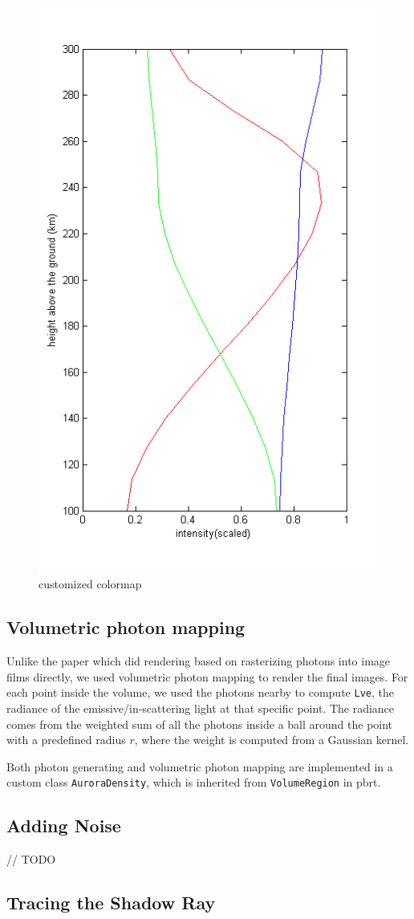 \documentclass[10pt,a4paper]{article}
\begin{document}
\begin{figure}[h]
\centering
\includegraphics[width=0.5\linewidth]{./colormap}
\caption{customized colormap}
\label{fig:colormap}
\end{figure}

\subsection{Volumetric photon mapping}

Unlike the paper \cite{baranoski2000simulating} which did rendering based on rasterizing photons into image films directly, we used volumetric photon mapping to render the final images. For each point inside the volume, we used the photons nearby to compute \texttt{Lve}, the radiance of the emissive/in-scattering light at that specific point. The radiance comes from the weighted sum of all the photons inside a ball around the point with a predefined radius $r$, where the weight is computed from a Gaussian kernel.

Both photon generating and volumetric photon mapping are implemented in a custom class \texttt{AuroraDensity}, which is inherited from \texttt{VolumeRegion} in pbrt.

\subsection{Adding Noise}

//	TODO

\subsection{Tracing the Shadow Ray}
\end{document}
